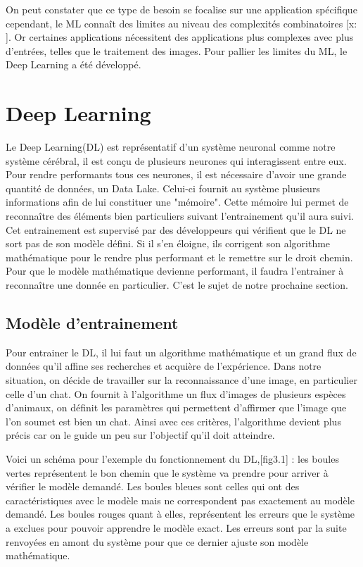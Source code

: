 \documentclass[12pt,a4paper,french]{report}
\begin{document}
On peut constater que ce type de besoin se focalise sur une application spécifique cependant, le ML connaît des limites au niveau des complexités combinatoires [x: ]. Or certaines applications nécessitent des applications plus complexes avec plus d'entrées, telles que le traitement des images. Pour pallier les limites du ML, le Deep Learning a été développé.


\chapter{Deep Learning}

Le Deep Learning(DL) est représentatif d'un système neuronal comme notre système cérébral, il est conçu de plusieurs neurones qui interagissent entre eux. Pour rendre performants tous ces neurones, il est nécessaire d'avoir une grande quantité de données, un Data Lake. Celui-ci fournit au système plusieurs informations afin de lui constituer une "mémoire". Cette mémoire lui permet de reconnaître des éléments bien particuliers suivant l'entrainement qu'il aura suivi. Cet entrainement est supervisé par des développeurs qui vérifient que le DL ne sort pas de son modèle défini.
Si il s'en éloigne, ils corrigent son algorithme mathématique pour le rendre plus performant et le remettre sur le droit chemin. Pour que le modèle mathématique devienne performant, il faudra l'entrainer à reconnaître une donnée en particulier. C'est le sujet de notre prochaine section.


\section{Modèle d'entrainement}

Pour entrainer le DL, il lui faut un algorithme mathématique et un grand flux de données qu'il affine ses recherches et acquière de l'expérience. Dans notre situation, on décide de travailler sur la reconnaissance d'une image, en particulier celle d'un chat.
On fournit à l'algorithme un flux d'images de plusieurs espèces d'animaux, on définit les paramètres qui permettent d'affirmer que l'image que l'on soumet est bien un chat. Ainsi avec ces critères, l'algorithme devient plus précis car on le guide un peu sur l'objectif qu'il doit atteindre.
 
Voici un schéma pour l'exemple du fonctionnement du DL,[fig3.1] : les boules vertes représentent le bon chemin que le système va prendre pour arriver à vérifier le modèle demandé. Les boules bleues sont celles qui ont des caractéristiques avec le modèle mais ne correspondent pas exactement au modèle demandé. Les boules rouges quant à elles, représentent les erreurs que le système a exclues pour pouvoir apprendre le modèle exact. Les erreurs sont par la suite renvoyées en amont du système pour que ce dernier ajuste son modèle mathématique.
\end{document}
